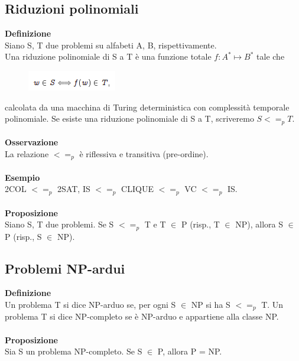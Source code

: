 \subsection{Riduzioni polinomiali}
\textbf{Definizione}\\
Siano S, T due problemi su alfabeti A, B, rispettivamente.\\
Una riduzione polinomiale di S a T è una funzione totale $f : A^* \mapsto B^*$ tale che
\begin{figure}[htp]
    \centering
    \includegraphics[scale=0.9]{tesi_stile/img/foto1cap12.png}
\end{figure}
calcolata da una macchina di Turing deterministica con complessità temporale polinomiale.
Se esiste una riduzione polinomiale di S a T, scriveremo $S <=_p T$.\\\\
\textbf{Osservazione}\\
La relazione $<=_p$ è riflessiva e transitiva (pre-ordine).\\\\
\textbf{Esempio}\\
2COL $<=_p$ 2SAT, IS $<=_p$ CLIQUE $<=_p$ VC $<=_p$ IS.\\\\
\textbf{Proposizione}\\
Siano S, T due problemi. Se S $<=_p$ T e T $\in$ P (risp., T $\in$ NP), allora S $\in$ P (risp., S $\in$ NP).
\newpage
\subsection{Problemi NP-ardui}
\textbf{Definizione}\\
Un problema T si dice NP-arduo se, per ogni S $\in$ NP si ha S $<=_p$ T.
Un problema T si dice NP-completo se è NP-arduo e appartiene alla classe
NP.\\\\
\textbf{Proposizione}\\
Sia S un problema NP-completo. Se S $\in$ P, allora P = NP.
